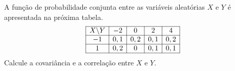 %
%


\begin{exercicioBanco}[\valorquestao]
     A função de probabilidade conjunta entre as variáveis aleatórias \(X\) e \(Y\) é apresentada na próxima tabela.
    \[
        \begin{array}{|c|c|c|c|c|}
            \hline
            X \backslash Y & -2 & 0 & 2 & 4 \\
            \hline
            -1 & 0,1 & 0,2 & 0,1 & 0,2 \\
            \hline
            1 & 0,2 & 0 & 0,1 & 0,1 \\
            \hline
        \end{array}
    \]
Calcule a covariância e a correlação entre \(X\) e \(Y\).
\end{exercicioBanco}


